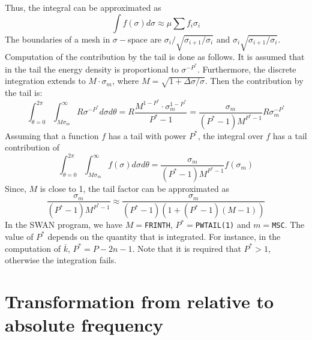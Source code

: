 \documentclass[12pt]{book}
\begin{document}
Thus, the integral can be approximated as
\begin{equation}
  \int f(\sigma)d\sigma \approx \mu \sum f_i \sigma_i
\end{equation}
The boundaries of a mesh in $\sigma-$space are $\sigma_i/\sqrt{\sigma_{i+1}/\sigma_{i}}$
and $\sigma_i \sqrt{\sigma_{i+1}/\sigma_{i}}$.
\\[2ex]
Computation of the contribution by the tail is done as follows. It is assumed that in the tail
the energy density is proportional to $\sigma^{-P^*}$. Furthermore, the discrete integration extends
to $M\cdot\sigma_m$, where
$M = \sqrt{1+\Delta \sigma/\sigma}$. Then the contribution by the tail is:
\begin{equation}
  \int_{\theta=0}^{2\pi} \int_{M\sigma_m}^{\infty} R \sigma^{-P^*} d\sigma d\theta =
  R \frac{M^{1-P^*} \cdot \sigma^{1-P^*}_{m}}{P^* - 1} =
  \frac{\sigma_m}{(P^*-1)M^{P^*-1}} R \sigma^{-P^*}_{m}
\end{equation}
Assuming that a function $f$ has a tail with power $P^*$, the integral over $f$ has a tail contribution of
\begin{equation}
  \int_{\theta=0}^{2\pi} \int_{M\sigma_m}^{\infty} f(\sigma)d\sigma d\theta =
  \frac{\sigma_m}{(P^*-1)M^{P^*-1}} f(\sigma_m)
\end{equation}
Since, $M$ is close to 1, the tail factor can be approximated as
\begin{equation}
  \frac{\sigma_m}{(P^*-1)M^{P^*-1}} \approx \frac{\sigma_m}{(P^*-1)(1+(P^*-1)(M-1))}
\end{equation}
In the SWAN program, we have $M=${\tt FRINTH}, $P^*=${\tt PWTAIL(1)} and $m=${\tt MSC}. The value of $P^*$
depends on the quantity that is integrated. For instance, in the computation of $\overline{k}$,
$P^*=P-2n-1$. Note that it is required that $P^*>1$, otherwise the integration fails.

\section{Transformation from relative to absolute frequency}
\end{document}
